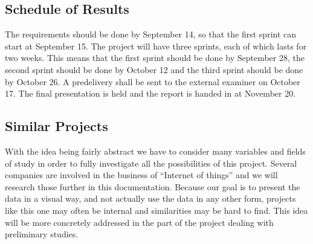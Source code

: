 \documentclass[../document.tex]{subfiles}
\begin{document}
\subsection{Schedule of Results}
The requirements should be done by September 14, so that the first sprint can start at September 15. The project will have three sprints, each of which lasts for two weeks. This means that the first sprint should be done by September 28, the second sprint should be done by October 12 and the third sprint should be done by October 26. A predelivery shall be sent to the external examiner on October 17. The final presentation is held and the report is handed in at November 20.

\subsection{Similar Projects}
With the idea being fairly abstract we have to consider many variables and fields of study in order to fully investigate all the possibilities of this project. Several companies are involved in the business of “Internet of things” and we will research those further in this documentation. Because our goal is to present the data in a visual way, and not actually use the data in any other form, projects like this one may often be internal and similarities may be hard to find. This idea will be more concretely addressed in the part of the project dealing with preliminary studies.
\end{document}
